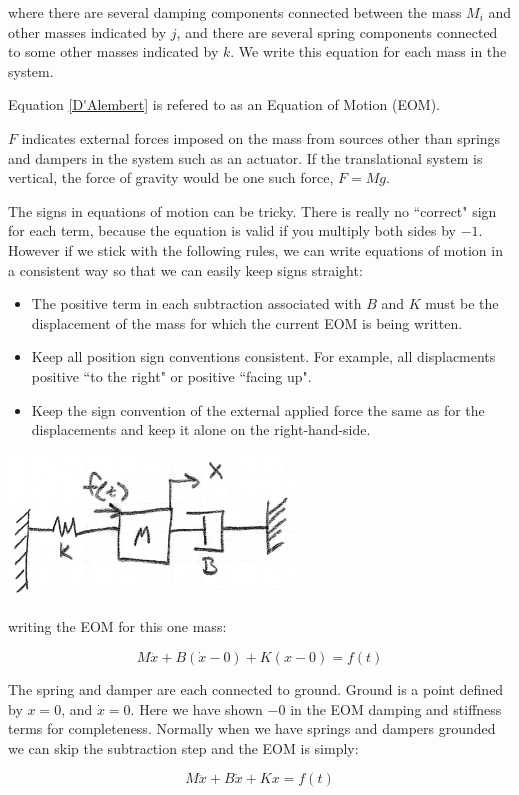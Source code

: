 where there are several damping components connected between the mass $M_i$ and other masses indicated by $j$, and there are several
spring components connected to some other masses indicated by $k$.  We write this equation for each mass in the system.

Equation \ref{D'Alembert} is refered to as an Equation of Motion (EOM).

$F$ indicates external forces imposed on the mass from sources other than springs and dampers in the system such as an actuator.  If the translational system is vertical, the force of gravity would be one such force, $F=Mg$.

The signs in equations of motion can be tricky.   There is really no ``correct" sign for each term, because the equation is valid if you multiply both sides by $-1$.   However if we stick with the following rules, we can write equations of motion in a consistent way so that we can easily keep signs straight:

\begin{itemize}

  \item The positive term in each subtraction associated with $B$ and $K$ must be the displacement of the mass for which the current EOM is being written.
  \item Keep all position sign conventions consistent.  For example, all displacments positive ``to the right" or positive ``facing up".
  \item Keep the sign convention of the external applied force the same as for the displacements and keep it alone on the right-hand-side.

\end{itemize}






\begin{ExampleSmall}

\includegraphics[width=3.0in]{figs02/00721a.png}

writing the EOM for this one mass:

\[
M\ddot{x} + B(\dot{x} - 0) + K(x-0) = f(t)
\]

The spring and damper are each connected to ground.  Ground is a point defined by $x=0$, and $\dot{x}=0$.   Here we have shown $-0$ in the EOM damping and stiffness terms for completeness.
Normally when we have springs and dampers grounded we can skip the subtraction step and the EOM is simply:

\[
M\ddot{x} + B\dot{x} + Kx = f(t)
\]

\end{ExampleSmall}





